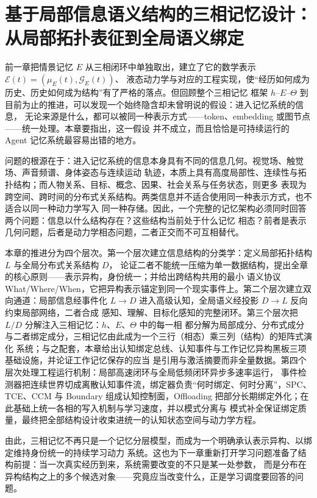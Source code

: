 \chapter{基于局部信息语义结构的三相记忆设计：从局部拓扑表征到全局语义绑定}
\label{chap:heterogeneous-three-phase-memory}

\begin{chapterlead}
前一章把情景记忆 $E$ 从三相闭环中单独取出，建立了它的数学表示 $\mathcal{E}(t)=(\mu_E(t),\mathcal{G}_E(t))$、
液态动力学与对应的工程实现，使“经历如何成为历史、历史如何成为结构”有了严格的落点。但回顾整个三相记忆
框架 $h$--$E$--$\Theta$ 到目前为止的推进，可以发现一个始终隐含却未曾明说的假设：进入记忆系统的信息，
无论来源是什么，都可以被同一种表示方式——token、embedding 或图节点——统一处理。本章要指出，这一假设
并不成立，而且恰恰是可持续运行的 Agent 记忆系统最容易出错的地方。

问题的根源在于：进入记忆系统的信息本身具有不同的信息几何。视觉场、触觉场、声音频谱、身体姿态与连续运动
轨迹，本质上具有高度局部性、连续性与拓扑结构；而人物关系、目标、概念、因果、社会关系与任务状态，则更多
表现为跨空间、跨时间的分布式关系结构。两类信息并不适合使用同一种表示方式，也不适合以同一种动力学写入
同一种存储。因此，一个完整的记忆架构必须同时回答两个问题：信息以什么结构存在？这些结构当前处于什么记忆
相态？前者是表示几何问题，后者是动力学相态问题，二者正交而不可互相替代。

本章的推进分为四个层次。第一个层次建立信息结构的分类学：定义局部拓扑结构 $L$ 与全局分布式关系结构 $D$，
论证二者不能统一压缩为单一数据结构，提出全章的核心原则——表示异构，身份统一；并给出跨结构共用的最小
语义协议 What/Where/When，它把异构表示锚定到同一个现实事件上。第二个层次建立双向通道：局部信息经事件化
$L\rightarrow D$ 进入高级认知，全局语义经投影 $D\rightarrow L$ 反向约束局部网络，二者合成
感知、理解、目标化感知的完整闭环。第三个层次把 $L/D$ 分解注入三相记忆：$h$、$E$、$\Theta$ 中的每一相
都分解为局部成分、分布式成分与二者绑定成分，三相记忆由此成为一个三行（相态）乘三列（结构）的矩阵式演化
系统；与之配套，本章给出认知绑定总线、认知事件与工作记忆异构黑板三项基础设施，并论证工作记忆保存的应当
是引用与激活摘要而非全量数据。第四个层次处理工程运行机制：局部高速闭环与全局低频闭环异步多速率运行，
事件检测器把连续世界切成离散认知事件流，绑定器负责“何时绑定、何时分离”，SPC、TCE、CCM 与 Boundary
组成认知控制面，Offloading 把部分长期绑定外化；在此基础上统一各相的写入机制与学习速度，并以模式分离与
模式补全保证绑定质量，最终把全部结构设计收束进统一的认知状态空间与动力学方程。

由此，三相记忆不再只是一个记忆分层模型，而成为一个明确承认表示异构、以绑定维持身份统一的持续学习动力
系统。这也为下一章重新打开学习问题准备了结构前提：当一次真实经历到来，系统需要改变的不只是某一处参数，
而是分布在异构结构之上的多个候选对象——究竟应当改变什么，正是学习调度要回答的问题。
\end{chapterlead}

